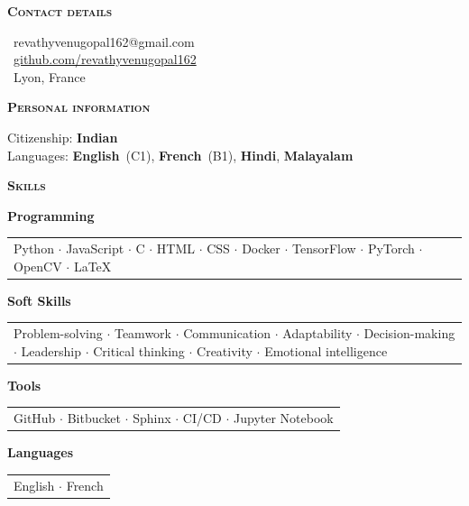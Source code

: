 \documentclass[11pt, a4paper]{article}
\newcommand{\headleft}[1]{\vspace*{3ex}\textsc{\textbf{#1}}\par%
    \vspace*{-1.5ex}\hrulefill\par\vspace*{0.7ex}}
\begin{document}
\begin{minipage}[t]{0.33\textwidth}
{\begin{minipage}[t][293mm][t]{0.82\textwidth}
\headleft{Contact details}
\small %
\MVAt\ {\small revathyvenugopal162@gmail.com} \\[0.4ex]
\Mundus\ \href{https://github.com/Revathyvenugopal162}{github.com/revathyvenugopal162} \\[0.1ex]
\Letter\ Lyon, France
\normalsize

\headleft{Personal information}
Citizenship: \textbf{Indian} \\[0.5ex]
Languages: \textbf{English}~(C1), \textbf{French}~(B1), \textbf{Hindi}, \textbf{Malayalam}
\normalsize

\headleft{Skills}
\small

\vspace{0.5ex}
\textbf{Programming}\\
\vspace{0.5ex}
\begin{tabularx}{\linewidth}{X}
Python $\cdot$ JavaScript $\cdot$ C $\cdot$ HTML $\cdot$ CSS $\cdot$ Docker $\cdot$ TensorFlow $\cdot$ PyTorch $\cdot$ OpenCV $\cdot$ LaTeX
\end{tabularx}

\vspace{0.5ex}
\textbf{Soft Skills}\\
\vspace{0.5ex}
\begin{tabularx}{\linewidth}{X}
Problem-solving $\cdot$ Teamwork $\cdot$ Communication $\cdot$ Adaptability $\cdot$ Decision-making $\cdot$ Leadership $\cdot$ Critical thinking $\cdot$ Creativity $\cdot$ Emotional intelligence
\end{tabularx}

\vspace{0.5ex}
\textbf{Tools}\\
\vspace{0.5ex}
\begin{tabularx}{\linewidth}{X}
GitHub $\cdot$ Bitbucket $\cdot$ Sphinx $\cdot$ CI/CD $\cdot$ Jupyter Notebook
\end{tabularx}

\vspace{0.5ex}
\textbf{Languages}\\
\vspace{0.5ex}
\begin{tabularx}{\linewidth}{X}
English $\cdot$ French
\end{tabularx}

\vspace{1.5ex}


\end{minipage}%
\textwidth\relax%
}
\end{minipage}%
\end{document}
